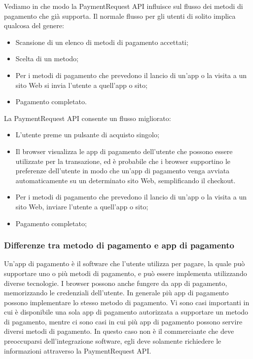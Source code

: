 \documentclass[italian]{article}
\begin{document}
	Vediamo in che modo la PaymentRequest API influisce sul flusso dei metodi di pagamento che già supporta. Il normale flusso per gli utenti di solito implica qualcosa del genere:
	\begin{itemize}
	\item Scansione di un elenco di metodi di pagamento accettati;
	\item Scelta di un metodo;
	\item Per i metodi di pagamento che prevedono il lancio di un'app o la visita a un sito Web si invia l'utente a quell'app o sito;
	\item Pagamento completato.
	\end{itemize}
	La PaymentRequest API consente un flusso migliorato:
	\begin{itemize}
	\item L'utente preme un pulsante di acquisto singolo;
	\item Il browser visualizza le app di pagamento dell'utente che possono essere utilizzate per la transazione, ed è probabile che i browser supportino le preferenze dell'utente in modo che un'app di pagamento venga avviata automaticamente su un determinato sito Web, semplificando il checkout.
	\item Per i metodi di pagamento che prevedono il lancio di un'app o la visita a un sito Web, inviare l'utente a quell'app o sito; 
	\item Pagamento completato; 
	\end{itemize}
	
	
	\subsubsection{Differenze tra metodo di pagamento e app di pagamento}
	Un'app di pagamento è il software che l'utente utilizza per pagare, la quale può supportare uno o più metodi di pagamento, e può essere implementa utilizzando diverse tecnologie. I browser possono anche fungere da app di pagamento, memorizzando le credenziali dell'utente. 
	In generale più app di pagamento possono implementare lo stesso metodo di pagamento. 
	Vi sono casi importanti in cui è disponibile una sola app di pagamento autorizzata a supportare un metodo di pagamento, mentre ci sono casi in cui più app di pagamento possono servire diversi metodi di pagamento. In questo caso non è il commerciante che deve preoccuparsi dell'integrazione software, egli deve solamente richiedere le informazioni attraverso la PaymentRequest API.
	
\end{document}
